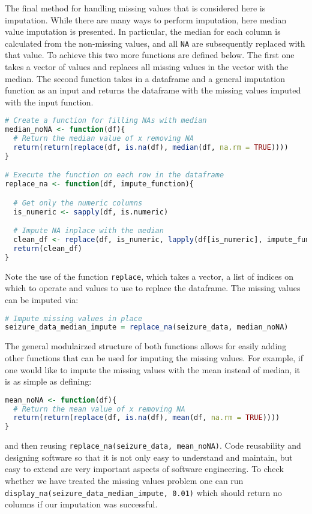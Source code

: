 The final method for handling missing values that is considered here is imputation. While there are many ways to perform imputation, here median value imputation is presented. In particular, the median for each column is calculated from the non-missing values, and all \verb|NA| are subsequently replaced with that value. To achieve this two more functions are defined below. The first one takes a vector of values and replaces all missing values in the vector with the median. The second function takes in a dataframe and a general imputation function as an input and returns the dataframe with the missing values imputed with the input function.
\begin{lstlisting}[language=R]
# Create a function for filling NAs with median
median_noNA <- function(df){
  # Return the median value of x removing NA
  return(return(replace(df, is.na(df), median(df, na.rm = TRUE))))
}

# Execute the function on each row in the dataframe
replace_na <- function(df, impute_function){

  # Get only the numeric columns
  is_numeric <- sapply(df, is.numeric)

  # Impute NA inplace with the median
  clean_df <- replace(df, is_numeric, lapply(df[is_numeric], impute_function))
  return(clean_df)
}
\end{lstlisting}
Note the use of the function \verb|replace|, which takes a vector, a list of indices on which to operate and values to use to replace the dataframe.
The missing values can be imputed via:
\begin{lstlisting}[language=R]
# Impute missing values in place
seizure_data_median_impute = replace_na(seizure_data, median_noNA)
\end{lstlisting}
The general modulairzed structure of both functions allows for easily adding other functions that can be used for imputing the missing values. For example, if one would like to impute the missing values with the mean instead of median, it is as simple as defining:
\begin{lstlisting}[language=R]
mean_noNA <- function(df){
  # Return the mean value of x removing NA
  return(return(replace(df, is.na(df), mean(df, na.rm = TRUE))))
}
\end{lstlisting}
and then reusing \verb|replace_na(seizure_data, mean_noNA)|. Code reusability and designing software so that it is not only easy to understand and maintain, but easy to extend are very important aspects of software engineering. To check whether we have treated the missing values problem one can run \verb|display_na(seizure_data_median_impute, 0.01)| which should return no columns if our imputation was successful.

